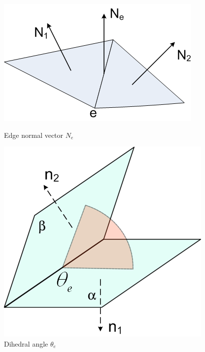 \documentclass[11pt]{article}
\begin{document}
\begin{figure}[htbp]
  \begin{minipage}[b]{0.45\linewidth}
	\centering
	\includegraphics[width=\textwidth]{curvature.png}
	\caption{Edge normal vector $N_e$}
	\label{fig:curvature}
  \end{minipage}
  \hspace{0.5cm}
  \begin{minipage}[b]{0.45\linewidth}
    \centering
    \includegraphics[width=\linewidth]{dihedral.png}
    \caption{Dihedral angle $\theta_e$}
    \label{fig:dihedral}
  \end{minipage}
\end{figure}
\end{document}
